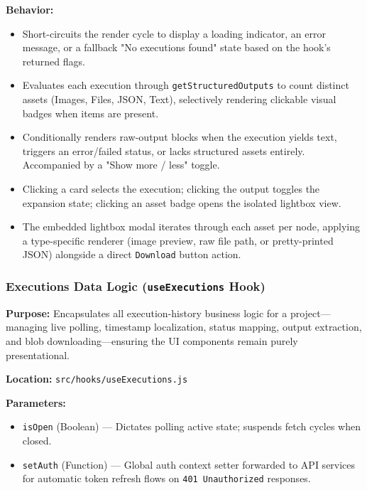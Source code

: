 \vspace{0.2cm}
\noindent\textbf{Behavior:}
\begin{itemize}
    \item Short-circuits the render cycle to display a loading indicator, an error message, or a fallback "No executions found" state based on the hook's returned flags.
    \item Evaluates each execution through \texttt{getStructuredOutputs} to count distinct assets (Images, Files, JSON, Text), selectively rendering clickable visual badges when items are present.
    \item Conditionally renders raw-output blocks when the execution yields text, triggers an error/failed status, or lacks structured assets entirely. Accompanied by a "Show more / less" toggle.
    \item Clicking a card selects the execution; clicking the output toggles the expansion state; clicking an asset badge opens the isolated lightbox view.
    \item The embedded lightbox modal iterates through each asset per node, applying a type-specific renderer (image preview, raw file path, or pretty-printed JSON) alongside a direct \texttt{Download} button action.
\end{itemize}

\subsubsection{Executions Data Logic (\texttt{useExecutions} Hook)}

\textbf{Purpose:} Encapsulates all execution-history business logic for a project—managing live polling, timestamp localization, status mapping, output extraction, and blob downloading—ensuring the UI components remain purely presentational.

\vspace{0.2cm}
\noindent\textbf{Location:} \texttt{src/hooks/useExecutions.js}

\vspace{0.2cm}
\noindent\textbf{Parameters:}
\begin{itemize}
    \item \texttt{isOpen} (Boolean) --- Dictates polling active state; suspends fetch cycles when closed.
    \item \texttt{setAuth} (Function) --- Global auth context setter forwarded to API services for automatic token refresh flows on \texttt{401 Unauthorized} responses.
\end{itemize}

